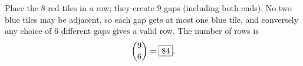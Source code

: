Place the $8$ red tiles in a row; they create $9$ gaps (including both ends). No two blue tiles may be adjacent, so each gap gets at most one blue tile, and conversely any choice of $6$ different gaps gives a valid row. The number of rows is
\[\dbinom96=\boxed{84}.\]
